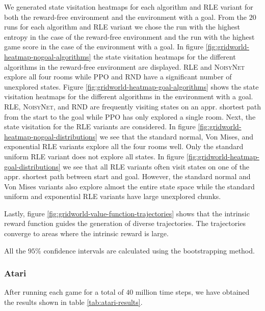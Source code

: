 \documentclass[10pt]{article} %
\begin{document}
We generated state visitation heatmaps for each algorithm and \textsc{RLE} variant for both the reward-free environment and the environment with a goal. From the $20$ runs for each algorithm and \textsc{RLE} variant we chose the run with the highest entropy in the case of the reward-free environment and the run with the highest game score in the case of the environment with a goal. In figure \ref{fig:gridworld-heatmap-nogoal-algorithms} the state visitation heatmaps for the different algorithms in the reward-free environment are displayed. \textsc{RLE} and \textsc{NoisyNet} explore all four rooms while \textsc{PPO} and \textsc{RND} have a significant number of unexplored states. Figure \ref{fig:gridworld-heatmap-goal-algorithms} shows the state visitation heatmaps for the different algorithms in the environment with a goal. \textsc{RLE}, \textsc{NoisyNet}, and \textsc{RND} are frequently visiting states on an appr. shortest path from the start to the goal while \textsc{PPO} has only explored a single room. Next, the state visitation for the \textsc{RLE} variants are considered. In figure \ref{fig:gridworld-heatmap-nogoal-distributions} we see that the standard normal, Von Mises, and exponential \textsc{RLE} variants explore all the four rooms well. Only the standard uniform \textsc{RLE} variant does not explore all states. In figure \ref{fig:gridworld-heatmap-goal-distributions} we see that all \textsc{RLE} variants often visit states on one of the appr. shortest path between start and goal. However, the standard normal and Von Mises variants also explore almost the entire state space while the standard uniform and exponential \textsc{RLE} variants have large unexplored chunks.

Lastly, figure \ref{fig:gridworld-value-function-trajectories} shows that the intrinsic reward function guides the generation of diverse trajectories. The trajectories converge to areas where the intrinsic reward is large. 

All the $95\%$ confidence intervals are calculated using the bootstrapping method. 

\subsubsection{Atari}

After running each game for a total of $40$ million time steps, we have obtained the results shown in table \ref{tab:atari-results}.
\end{document}
